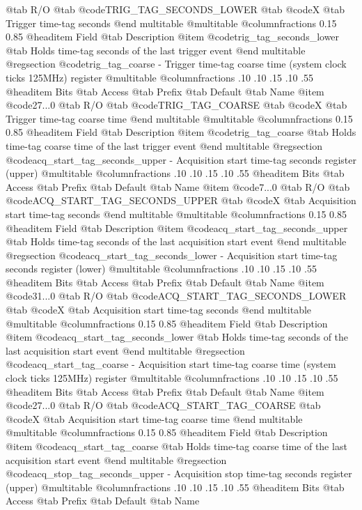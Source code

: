 @tab R/O @tab
@code{TRIG_TAG_SECONDS_LOWER}
@tab @code{X} @tab 
Trigger time-tag seconds
@end multitable
@multitable @columnfractions 0.15 0.85
@headitem Field @tab Description
@item @code{trig_tag_seconds_lower} @tab Holds time-tag seconds of the last trigger event
@end multitable
@regsection @code{trig_tag_coarse} - Trigger time-tag coarse time (system clock ticks 125MHz) register
@multitable @columnfractions .10 .10 .15 .10 .55
@headitem Bits @tab Access @tab Prefix @tab Default @tab Name
@item @code{27...0}
@tab R/O @tab
@code{TRIG_TAG_COARSE}
@tab @code{X} @tab 
Trigger time-tag coarse time
@end multitable
@multitable @columnfractions 0.15 0.85
@headitem Field @tab Description
@item @code{trig_tag_coarse} @tab Holds time-tag coarse time of the last trigger event
@end multitable
@regsection @code{acq_start_tag_seconds_upper} - Acquisition start time-tag seconds register (upper)
@multitable @columnfractions .10 .10 .15 .10 .55
@headitem Bits @tab Access @tab Prefix @tab Default @tab Name
@item @code{7...0}
@tab R/O @tab
@code{ACQ_START_TAG_SECONDS_UPPER}
@tab @code{X} @tab 
Acquisition start time-tag seconds
@end multitable
@multitable @columnfractions 0.15 0.85
@headitem Field @tab Description
@item @code{acq_start_tag_seconds_upper} @tab Holds time-tag seconds of the last acquisition start event
@end multitable
@regsection @code{acq_start_tag_seconds_lower} - Acquisition start time-tag seconds register (lower)
@multitable @columnfractions .10 .10 .15 .10 .55
@headitem Bits @tab Access @tab Prefix @tab Default @tab Name
@item @code{31...0}
@tab R/O @tab
@code{ACQ_START_TAG_SECONDS_LOWER}
@tab @code{X} @tab 
Acquisition start time-tag seconds
@end multitable
@multitable @columnfractions 0.15 0.85
@headitem Field @tab Description
@item @code{acq_start_tag_seconds_lower} @tab Holds time-tag seconds of the last acquisition start event
@end multitable
@regsection @code{acq_start_tag_coarse} - Acquisition start time-tag coarse time (system clock ticks 125MHz) register
@multitable @columnfractions .10 .10 .15 .10 .55
@headitem Bits @tab Access @tab Prefix @tab Default @tab Name
@item @code{27...0}
@tab R/O @tab
@code{ACQ_START_TAG_COARSE}
@tab @code{X} @tab 
Acquisition start time-tag coarse time
@end multitable
@multitable @columnfractions 0.15 0.85
@headitem Field @tab Description
@item @code{acq_start_tag_coarse} @tab Holds time-tag coarse time of the last acquisition start event
@end multitable
@regsection @code{acq_stop_tag_seconds_upper} - Acquisition stop time-tag seconds register (upper)
@multitable @columnfractions .10 .10 .15 .10 .55
@headitem Bits @tab Access @tab Prefix @tab Default @tab Name
